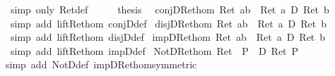 \begin{isabellebody}
\ {\isacharparenleft}simp\ only{\isacharcolon}\ Ret{\isacharunderscore}def{\isacharparenright}\isanewline
\ \ \isamarkupfalse%
\ \isamarkupfalse%
\ {\isacharquery}thesis\ \isamarkupfalse%
\isacommand{{\isachardot}}\isanewline
\isamarkupfalse%
\isanewline
\isanewline
\isanewline
\isamarkupfalse%
\ conjD{\isacharunderscore}Ret{\isacharunderscore}hom{\isacharcolon}\ {\isachardoublequote}Ret\ {\isacharparenleft}a{\isasymand}b{\isacharparenright}\ {\isacharequal}\ {\isacharparenleft}{\isacharparenleft}Ret\ a{\isacharparenright}\ {\isasymand}\isactrlsub D\ {\isacharparenleft}Ret\ b{\isacharparenright}{\isacharparenright}{\isachardoublequote}\isanewline
\ \ \isamarkupfalse%
\ {\isacharparenleft}simp\ add{\isacharcolon}\ lift{\isacharunderscore}Ret{\isacharunderscore}hom\ conjD{\isacharunderscore}def{\isacharparenright}\isanewline
\isamarkupfalse%
\ disjD{\isacharunderscore}Ret{\isacharunderscore}hom{\isacharcolon}\ {\isachardoublequote}Ret\ {\isacharparenleft}a{\isasymor}b{\isacharparenright}\ {\isacharequal}\ {\isacharparenleft}{\isacharparenleft}Ret\ a{\isacharparenright}\ {\isasymor}\isactrlsub D\ {\isacharparenleft}Ret\ b{\isacharparenright}{\isacharparenright}{\isachardoublequote}\isanewline
\ \ \isamarkupfalse%
\ {\isacharparenleft}simp\ add{\isacharcolon}\ lift{\isacharunderscore}Ret{\isacharunderscore}hom\ disjD{\isacharunderscore}def{\isacharparenright}\isanewline
\isamarkupfalse%
\ impD{\isacharunderscore}Ret{\isacharunderscore}hom{\isacharcolon}\ {\isachardoublequote}Ret\ {\isacharparenleft}a{\isasymlongrightarrow}b{\isacharparenright}\ {\isacharequal}\ {\isacharparenleft}{\isacharparenleft}Ret\ a{\isacharparenright}\ {\isasymlongrightarrow}\isactrlsub D\ {\isacharparenleft}Ret\ b{\isacharparenright}{\isacharparenright}{\isachardoublequote}\isanewline
\ \ \isamarkupfalse%
\ {\isacharparenleft}simp\ add{\isacharcolon}\ lift{\isacharunderscore}Ret{\isacharunderscore}hom\ impD{\isacharunderscore}def{\isacharparenright}\isanewline
\isanewline
\isamarkupfalse%
\ NotD{\isacharunderscore}Ret{\isacharunderscore}hom{\isacharcolon}\ {\isachardoublequote}Ret\ {\isacharparenleft}{\isasymnot}\ P{\isacharparenright}\ {\isacharequal}\ {\isacharparenleft}{\isasymnot}\isactrlsub D\ {\isacharparenleft}Ret\ P{\isacharparenright}{\isacharparenright}{\isachardoublequote}\isanewline
\ \ \isamarkupfalse%
simp\ add{\isacharcolon}\ NotD{\isacharunderscore}def\ impD{\isacharunderscore}Ret{\isacharunderscore}hom{\isacharbrackleft}symmetric{\isacharbrackright}{\isacharparenright}\isamarkupfalse%

\end{isabellebody}

